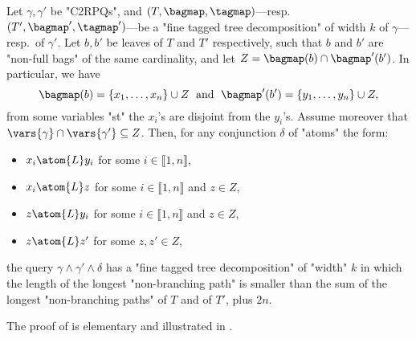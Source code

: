 \begin{proposition}
    \AP\label{prop:connecting-tree-decompositions}
    Let $\gamma,\gamma'$ be "C2RPQs",
    and $(T,\bagmap,\tagmap)$---resp.\ $(T',\bagmap',\tagmap')$---be
	a "fine tagged tree decomposition" of width $k$ of $\gamma$---resp.\ of $\gamma'$.
    Let $b, b'$ be leaves of $T$ and $T'$ respectively, such that $b$ and $b'$ are "non-full bags"
	of the same cardinality,
	and let $Z = \bagmap(b) \cap \bagmap'(b')$. In particular, we have
    \[
        \bagmap(b) = \{x_1,\dotsc,x_n\}\cup Z
        \;\text{ and }\;
        \bagmap'(b') = \{y_1,\dotsc,y_n\}\cup Z,
    \]
	from some variables "st" the $x_i$'s are disjoint from the $y_i$'s.
	Assume moreover that $\vars{\gamma} \cap \vars{\gamma'} \subseteq Z$.
    Then, for any conjunction $\delta$ of "atoms" the form:
	\begin{itemize}
		\item $x_i \atom{L} y_i$ for some $i \in \lBrack 1, n \rBrack$,
		\item $x_i \atom{L} z$ for some $i \in \lBrack 1, n \rBrack$ and $z\in Z$,
		\item $z \atom{L} y_i$ for some $i \in \lBrack 1, n \rBrack$ and $z\in Z$,
		\item $z \atom{L} z'$ for some $z, z'\in Z$,
	\end{itemize}
	the query $\gamma \land \gamma' \land \delta$
	has a "fine tagged tree decomposition"
    of "width" $k$ in which the length of the longest "non-branching path" is smaller
    than the sum of the longest "non-branching paths" of $T$ and of $T'$, plus $2n$.
\end{proposition}

The proof of  is elementary and illustrated in .

